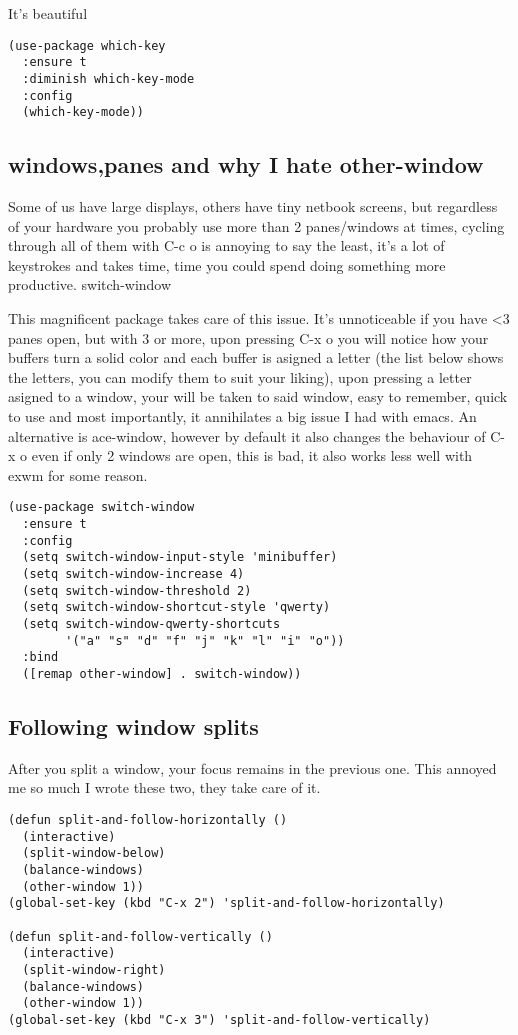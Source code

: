 \documentclass[12pt]{article}
\begin{document}
It’s beautiful
\begin{verbatim}
(use-package which-key
  :ensure t
  :diminish which-key-mode
  :config
  (which-key-mode))
\end{verbatim}

\subsection{windows,panes and why I hate other-window}
\label{sec:orgd068791}

Some of us have large displays, others have tiny netbook screens, but regardless of your hardware you probably use more than 2 panes/windows at times, cycling through all of them with C-c o is annoying to say the least, it’s a lot of keystrokes and takes time, time you could spend doing something more productive.
switch-window

This magnificent package takes care of this issue. It’s unnoticeable if you have <3 panes open, but with 3 or more, upon pressing C-x o you will notice how your buffers turn a solid color and each buffer is asigned a letter (the list below shows the letters, you can modify them to suit your liking), upon pressing a letter asigned to a window, your will be taken to said window, easy to remember, quick to use and most importantly, it annihilates a big issue I had with emacs. An alternative is ace-window, however by default it also changes the behaviour of C-x o even if only 2 windows are open, this is bad, it also works less well with exwm for some reason.
\begin{verbatim}
(use-package switch-window
  :ensure t
  :config
  (setq switch-window-input-style 'minibuffer)
  (setq switch-window-increase 4)
  (setq switch-window-threshold 2)
  (setq switch-window-shortcut-style 'qwerty)
  (setq switch-window-qwerty-shortcuts
        '("a" "s" "d" "f" "j" "k" "l" "i" "o"))
  :bind
  ([remap other-window] . switch-window))
\end{verbatim}

\subsection{Following window splits}
\label{sec:org5e0ee6e}

After you split a window, your focus remains in the previous one. This annoyed me so much I wrote these two, they take care of it.
\begin{verbatim}
(defun split-and-follow-horizontally ()
  (interactive)
  (split-window-below)
  (balance-windows)
  (other-window 1))
(global-set-key (kbd "C-x 2") 'split-and-follow-horizontally)

(defun split-and-follow-vertically ()
  (interactive)
  (split-window-right)
  (balance-windows)
  (other-window 1))
(global-set-key (kbd "C-x 3") 'split-and-follow-vertically)

\end{verbatim}
\end{document}
